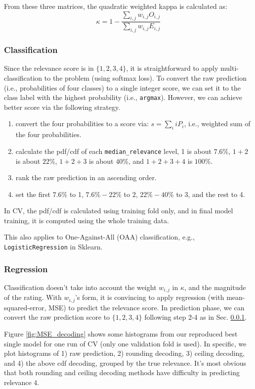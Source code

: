 \documentclass[12pt]{article}
\begin{document}
From these three matrices, the quadratic weighted kappa is calculated as:
\begin{equation}
\kappa = 1 - \frac{\sum_{i,j}w_{i,j}O_{i,j}}{\sum_{i,j}w_{i,j}E_{i,j}}
\end{equation}

\subsubsection{Classification}
\label{subsubsec:Classification}
Since the relevance score is in $\{1,2,3,4\}$, it is straightforward to apply multi-classification to the problem (using softmax loss). To convert the raw prediction (i.e., probabilities of four classes) to a single integer score, we can set it to the class label with the highest probability (i.e., \texttt{argmax}). However, we can achieve better score via the following strategy.
\begin{enumerate}
\item convert the four probabilities to a score via: $s = \sum_{i}iP_i$, i.e., weighted sum of the four probabilities.
\item calculate the pdf/cdf of each \texttt{median\_relevance} level, 1 is about $7.6\%$, $1+2$ is about $22\%$, $1+2+3$ is about $40\%$, and $1+2+3+4$ is $100\%$.
\item rank the raw prediction in an ascending order.
\item set the first $7.6\%$ to 1, $7.6\%-22\%$ to 2, $22\%-40\%$ to 3, and the rest to 4.
\end{enumerate}
In CV, the pdf/cdf is calculated using training fold only, and in final model training, it is computed using the whole training data.

This also applies to One-Against-All (OAA) classification, e.g., \texttt{LogisticRegression} in Sklearn.

\subsubsection{Regression}
Classification doesn't take into account the weight $w_{i,j}$ in $\kappa$, and the magnitude of the rating. With $w_{i,j}$'s form, it is convincing to apply regression (with mean-squared-error, MSE) to predict the relevance score. In prediction phase, we can convert the raw prediction score to $\{1,2,3,4\}$ following step 2-4 as in Sec. \ref{subsubsec:Classification}.

Figure \ref{fig:MSE_decoding} shows some histograms from our reproduced best single model for one run of CV (only one validation fold is used). In specific, we plot histograms of 1) raw prediction, 2) rounding decoding, 3) ceiling decoding, and 4) the above cdf decoding, grouped by the true relevance. It's most obvious that both rounding and ceiling decoding methods have difficulty in predicting relevance 4.
\end{document}
